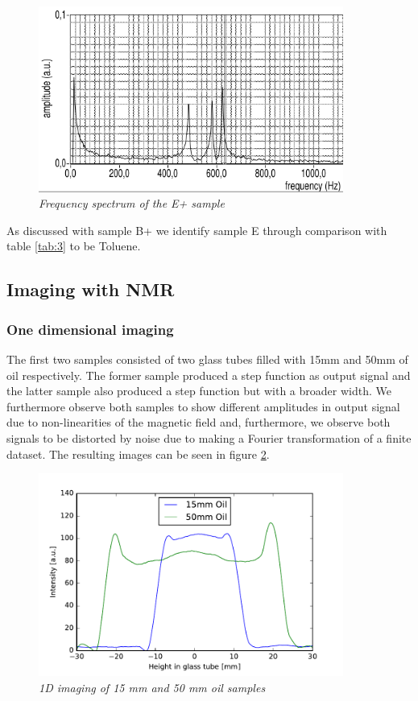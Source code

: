 \begin{figure}[h]
	\centering
	\includegraphics[width=100mm]{E+}
	\caption{\itshape Frequency spectrum of the E+ sample}
	\label{fig:10}
\end{figure}
\noindent
As discussed with sample B+ we identify sample E through comparison with table \ref{tab:3} to be Toluene.

\subsection{Imaging with NMR}
\subsubsection{One dimensional imaging}
The first two samples consisted of two glass tubes filled with 15mm and 50mm of oil respectively. The former sample produced a step function as output signal and the latter sample also  produced a step function but with a broader width. We furthermore observe both samples to show different amplitudes in output signal due to non-linearities of the magnetic field and, furthermore, we observe both signals to be distorted by noise due to making a Fourier transformation of a finite dataset. The resulting images can be seen in figure \ref{fig:11}.
\begin{figure}[h]
	\includegraphics[width=100mm]{1DOilSamples}	
	\centering
	\caption{\itshape 1D imaging of 15 mm and 50 mm oil samples }
	\label{fig:11}
\end{figure}

